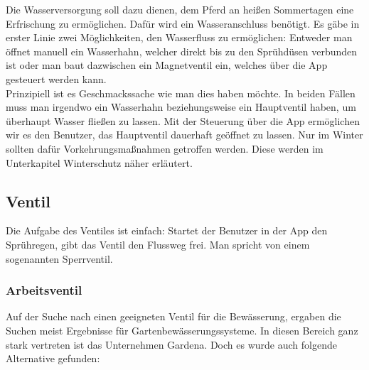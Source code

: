 \documentclass[12pt]{scrreprt} %
\begin{document}
Die Wasserversorgung soll dazu dienen, dem Pferd an heißen Sommertagen eine Erfrischung zu ermöglichen. Dafür wird ein Wasseranschluss benötigt. Es gäbe in erster Linie zwei Möglichkeiten, den Wasserfluss zu ermöglichen: Entweder man öffnet manuell ein Wasserhahn, welcher direkt bis zu den Sprühdüsen verbunden ist oder man baut dazwischen ein Magnetventil ein, welches über die App gesteuert werden kann. \\
Prinzipiell ist es Geschmackssache wie man dies haben möchte. In beiden Fällen muss man irgendwo ein Wasserhahn beziehungsweise ein Hauptventil haben, um überhaupt Wasser fließen zu lassen. 
Mit der Steuerung über die App ermöglichen wir es den Benutzer, das Hauptventil dauerhaft geöffnet zu lassen. Nur im Winter sollten dafür Vorkehrungsmaßnahmen getroffen werden. Diese werden im Unterkapitel Winterschutz näher erläutert.  

\subsection{Ventil}
\label{sec:ventil}

Die Aufgabe des Ventiles ist einfach: Startet der Benutzer in der App den Sprühregen, gibt das Ventil den Flussweg frei. Man spricht von einem sogenannten Sperrventil. 

\subsubsection{Arbeitsventil}
\label{sec:ventilSuche}

Auf der Suche nach einen geeigneten Ventil für die Bewässerung, ergaben die Suchen meist Ergebnisse für Gartenbewässerungssysteme. In diesen Bereich ganz stark vertreten ist das Unternehmen Gardena. Doch es wurde auch folgende Alternative gefunden:
\end{document}

